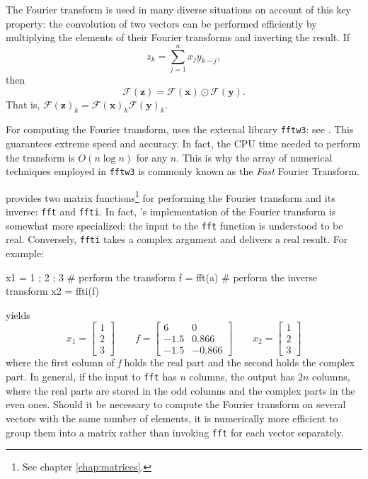 The Fourier transform is used in many diverse situations
on account of this key property: the convolution of two vectors can be
performed efficiently by multiplying the elements of their Fourier
transforms and inverting the result.  If
\[
  z_k = \sum_{j=1}^n x_j y_{k-j} ,
\]
then
\[
  \mathcal{F}(\mathbf{z}) = \mathcal{F}(\mathbf{x}) \odot
  \mathcal{F}(\mathbf{y}) .
\]
That is, $\mathcal{F}(\mathbf{z})_k = \mathcal{F}(\mathbf{x})_k
\mathcal{F}(\mathbf{y})_k$.

For computing the Fourier transform,  uses the external
library \texttt{fftw3}: see \cite{frigo05}. This guarantees
extreme speed and accuracy. In fact, the CPU time needed to perform
the transform is $O(n \log n)$ for any $n$. This is why the array of
numerical techniques employed in \texttt{fftw3} is commonly known as
the \emph{Fast} Fourier Transform.

 provides two matrix functions\footnote{See chapter
  \ref{chap:matrices}.} for performing the Fourier transform and its
inverse: \texttt{fft} and \texttt{ffti}. In fact, 's
implementation of the Fourier transform is somewhat more specialized:
the input to the \texttt{fft} function is understood to be real.
Conversely, \texttt{ffti} takes a complex argument and delivers a real
result. For example:
\begin{code}
x1 = { 1 ; 2 ; 3 }
# perform the transform
f = fft(a)
# perform the inverse transform
x2 = ffti(f)
\end{code}
yields
\[
  x_1 = \left[ \begin{array}{c} 1 \\ 2 \\ 3 \end{array} \right] 
  \qquad
  f = \left[ \begin{array}{rr} 
      6 & 0 \\ -1.5 & 0.866 \\ -1.5 & -0.866 
   \end{array} \right] 
  \qquad
  x_2 = \left[ \begin{array}{c} 1 \\ 2 \\ 3 \end{array} \right] 
\]
where the first column of \emph{f} holds the real part and the second
holds the complex part. In general, if the input to \texttt{fft} has
$n$ columns, the output has $2n$ columns, where the real parts are
stored in the odd columns and the complex parts in the even
ones. Should it be necessary to compute the Fourier transform on
several vectors with the same number of elements, it is numerically more
efficient to group them into a matrix rather than invoking
\texttt{fft} for each vector separately.


